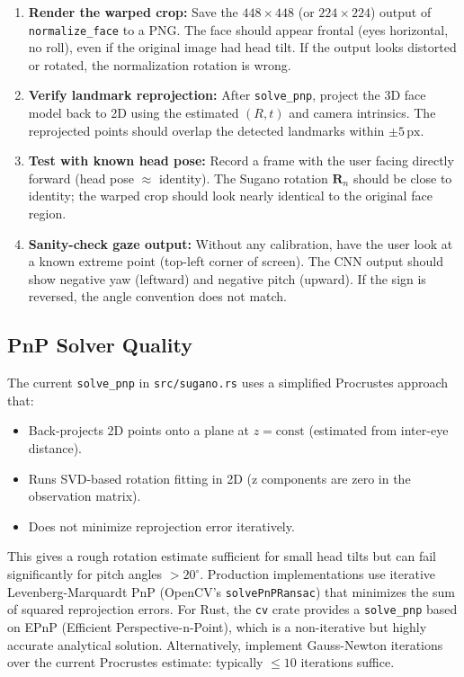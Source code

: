 \documentclass[11pt,a4paper]{article}
\begin{document}
\begin{enumerate}
  \item \textbf{Render the warped crop:} Save the $448\times448$ (or $224\times224$) output of \texttt{normalize\_face} to a PNG. The face should appear frontal (eyes horizontal, no roll), even if the original image had head tilt. If the output looks distorted or rotated, the normalization rotation is wrong.

  \item \textbf{Verify landmark reprojection:} After \texttt{solve\_pnp}, project the 3D face model back to 2D using the estimated $(R, t)$ and camera intrinsics. The reprojected points should overlap the detected landmarks within $\pm5\,\text{px}$.

  \item \textbf{Test with known head pose:} Record a frame with the user facing directly forward (head pose $\approx$ identity). The Sugano rotation $\mathbf{R}_n$ should be close to identity; the warped crop should look nearly identical to the original face region.

  \item \textbf{Sanity-check gaze output:} Without any calibration, have the user look at a known extreme point (top-left corner of screen). The CNN output should show negative yaw (leftward) and negative pitch (upward). If the sign is reversed, the angle convention does not match.
\end{enumerate}

\subsection{PnP Solver Quality}

The current \texttt{solve\_pnp} in \texttt{src/sugano.rs} uses a simplified Procrustes approach that:
\begin{itemize}
  \item Back-projects 2D points onto a plane at $z = \text{const}$ (estimated from inter-eye distance).
  \item Runs SVD-based rotation fitting in 2D (z components are zero in the observation matrix).
  \item Does not minimize reprojection error iteratively.
\end{itemize}

This gives a rough rotation estimate sufficient for small head tilts but can fail significantly for pitch angles $>20^\circ$.
Production implementations use iterative Levenberg-Marquardt PnP (OpenCV's \texttt{solvePnPRansac}) that minimizes the sum of squared reprojection errors. For Rust, the \texttt{cv} crate provides a \texttt{solve\_pnp} based on EPnP (Efficient Perspective-n-Point), which is a non-iterative but highly accurate analytical solution. Alternatively, implement Gauss-Newton iterations over the current Procrustes estimate: typically $\leq10$ iterations suffice.
\end{document}
